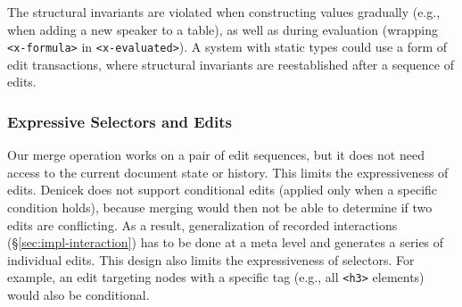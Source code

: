 \documentclass[sigconf]{acmart}
\newcommand{\ident}[1]{{\sffamily #1}}
\begin{document}
The structural invariants are violated when constructing values gradually (e.g., when adding a new
speaker to a table), as well as during evaluation (wrapping {\small\Verb_<x-formula>_}
in {\small\Verb_<x-evaluated>_}). A system with static types could use a form of edit
transactions, where structural invariants are reestablished after a sequence of edits.

%


\subsubsection*{Expressive Selectors and Edits}
Our merge operation works on a pair of edit sequences, but it does not need access
to the current document state or history. This limits the expressiveness of edits. Denicek does not
support conditional edits (applied only when a specific condition holds), because merging would then
not be able to determine if two edits are conflicting. As a result, generalization of recorded
interactions (\S\ref{sec:impl-interaction}) has to be done at a meta level and generates a series
of individual edits. This design also limits the expressiveness of selectors. For example,
an edit targeting nodes with a specific tag (e.g., all {\small\Verb_<h3>_} elements) would also be
conditional.
\end{document}
